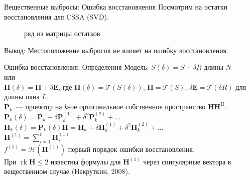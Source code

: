 \documentclass[ucs, notheorems, handout]{beamer}
\DeclareMathOperator{\rk}{rk}
\begin{document}
\begin{frame}{Вещественные выбросы: Ошибка восстановления}
    Посмотрим на остатки восстановления для CSSA (SVD).
   \begin{figure}[ht]
    \caption{ряд из матрицы остатков}
    \end{figure}
    \alert{Вывод:} Местоположение выбросов не влияет на ошибку восстановления.
\end{frame}
\begin{frame}{Ошибка восстановления: Определения}
    \alert{Модель:} $S(\delta) = S + \delta R$ длины $N$\\
    или\\
     $\mathbf{H}(\delta) = \mathbf{H} + \delta \mathbf{E}$, где $\mathbf{H}(\delta) = \mathcal{T}(S(\delta))$, $\mathbf{H} = \mathcal{T}(S)$, $\delta\mathbf{E} = \mathcal{T}(\delta R)$ для длины окна $L$.\\
     $\mathbf{P}_k$~--- проектор на $k$-ое ортогональное собственное пространство $\mathbf{H}\mathbf{H}^{\mathrm{H}}$.\\
     $\mathbf{P}_k(\delta) = \mathbf{P}_k + \delta\mathbf{P}^{(1)}_k +  \delta^2\mathbf{P}^{(2)}_k + \ldots$\\
     $\mathbf{H}_k(\delta) = \mathbf{P}_k(\delta) \mathbf{H} = \mathbf{H}_k + \delta\mathbf{H}^{(1)}_k +  \delta^2\mathbf{H}^{(2)}_k + \ldots$\\
     \vspace{1em}
     $\mathbf{H}^{(1)} = \sum_{i = 1}^{r} \mathbf{H}^{(1)}_i$\\
     $f^{(1)} = \mathcal{H}(\mathbf{H}^{(1)})$ первый порядок ошибки восстановления.\\
     \vspace{1em}
     При $\rk \mathbf{H} \leq 2$ известны формулы для $\mathbf{H}^{(1)}$ через сингулярные вектора в вещественном случае (Некруткин, 2008).
\end{frame}
\end{document}
